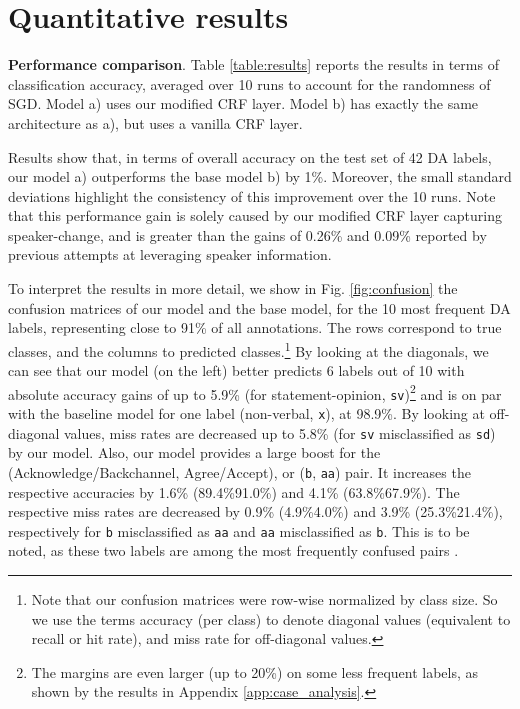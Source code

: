 \documentclass[11pt,a4paper]{article}
\begin{document}
\section{Quantitative results}
\noindent \textbf{Performance comparison}. Table \ref{table:results} reports the results in terms of classification accuracy, averaged over 10 runs to account for the randomness of SGD.
Model a) uses our modified CRF layer. Model b) has exactly the same architecture as a), but uses a vanilla CRF layer.

Results show that, in terms of overall accuracy on the test set of 42 DA labels, our model a) outperforms the base model b) by 1\%.
Moreover, the small standard deviations highlight the consistency of this improvement over the 10 runs.
Note that this performance gain is solely caused by our modified CRF layer capturing speaker-change, and is greater than the gains of 0.26\% \citep{liu-etal-2017-using-context} and 0.09\% \citep{bothe-etal-2018-context} reported by previous attempts at leveraging speaker information.


To interpret the results in more detail, we show in Fig. \ref{fig:confusion} the confusion matrices of our model and the base model, for the 10 most frequent DA labels, representing close to 91\% of all annotations.
The rows correspond to true classes, and the columns to predicted classes.\footnote{Note that our confusion matrices were row-wise normalized by class size. So we use the terms accuracy (per class) to denote diagonal values (equivalent to recall or hit rate), and miss rate for off-diagonal values.}
By looking at the diagonals, we can see that our model (on the left) better predicts 6 labels out of 10 with absolute accuracy gains of up to 5.9\% (for statement-opinion, \texttt{sv})\footnote{The margins are even larger (up to 20\%) on some less frequent labels, as shown by the results in Appendix \ref{app:case_analysis}.} and is on par with the baseline model for one label (non-verbal, \texttt{x}), at 98.9\%.
By looking at off-diagonal values, miss rates are decreased up to 5.8\% (for \texttt{sv} misclassified as \texttt{sd}) by our model.
Also, our model provides a large boost for the (Acknowledge/Backchannel, Agree/Accept), or (\texttt{b}, \texttt{aa}) pair.
It increases the respective accuracies by 1.6\% (89.4\%91.0\%) and 4.1\% (63.8\%67.9\%).
The respective miss rates are decreased by 0.9\% (4.9\%4.0\%) and 3.9\% (25.3\%21.4\%), respectively for \texttt{b} misclassified as \texttt{aa} and  \texttt{aa} misclassified as \texttt{b}.
This is to be noted, as these two labels are among the most frequently confused pairs \citep{kumar2018dialogue,chen2018dialogue}.
\end{document}
